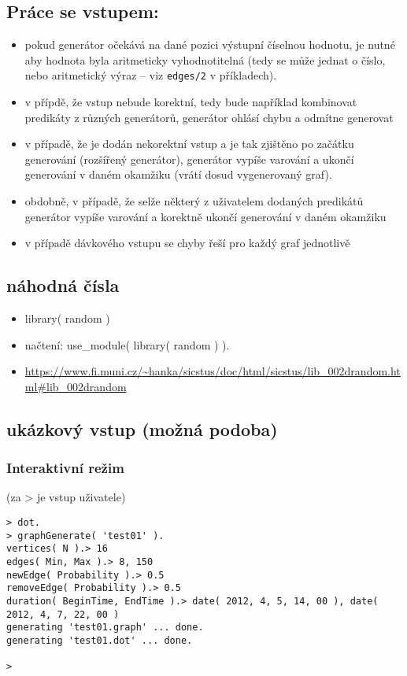 \documentclass[11pt, a4paper]{article}
\newcommand{\pl}[1]{\texttt{#1}} %
\theoremstyle{plain}
\theoremstyle{definition}
\theoremstyle{remark}
\begin{document}
\subsection{Práce se vstupem:}
\begin{itemize}
    \item pokud generátor očekává na dané pozici výstupní číselnou hodnotu, je nutné
    aby hodnota byla aritmeticky vyhodnotitelná (tedy se může jednat o číslo,
    nebo aritmetický výraz -- viz \pl{edges/2} v příkladech).
    \item v přípdě, že vstup nebude korektní, tedy bude například kombinovat predikáty
    z různých generátorů, generátor ohlásí chybu a odmítne generovat
    \item v případě, že je dodán nekorektní vstup a je tak zjištěno po začátku generování
    (rozšířený generátor), generátor vypíše varování a ukončí generování v daném
    okamžiku (vrátí dosud vygenerovaný graf).
    \item obdobně, v případě, že selže některý z uživatelem dodaných predikátů generátor
    vypíše varování a korektně ukončí generování v daném okamžiku
    \item v případě dávkového vstupu se chyby řeší pro každý graf jednotlivě
\end{itemize}

\subsection{náhodná čísla}
\begin{itemize}
    \item library( random )
    \item načtení: use\_module( library( random ) ).
    \item \url{https://www.fi.muni.cz/~hanka/sicstus/doc/html/sicstus/lib_002drandom.html#lib_002drandom}
\end{itemize}

\subsection{ukázkový vstup (možná podoba)}

\subsubsection{Interaktivní režim}
(za > je vstup uživatele)
\begin{verbatim}
> dot.
> graphGenerate( 'test01' ).
vertices( N ).> 16
edges( Min, Max ).> 8, 150
newEdge( Probability ).> 0.5
removeEdge( Probability ).> 0.5
duration( BeginTime, EndTime ).> date( 2012, 4, 5, 14, 00 ), date( 2012, 4, 7, 22, 00 )
generating 'test01.graph' ... done.
generating 'test01.dot' ... done.

>
\end{verbatim}
\end{document}
